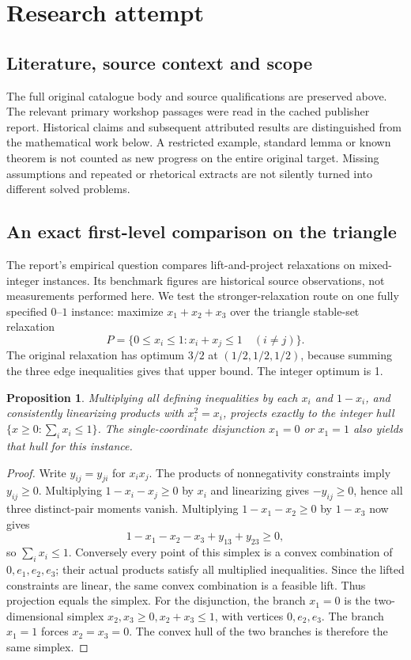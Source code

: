 \documentclass[11pt]{article}
\newtheorem{proposition}{Proposition}
\begin{document}
\section{Research attempt}
\subsection{Literature, source context and scope}
The full original catalogue body and source qualifications are preserved above. The relevant primary workshop passages were read in the cached publisher report. Historical claims and subsequent attributed results are distinguished from the mathematical work below. A restricted example, standard lemma or known theorem is not counted as new progress on the entire original target. Missing assumptions and repeated or rhetorical extracts are not silently turned into different solved problems.

\subsection{An exact first-level comparison on the triangle}
The report's empirical question compares lift-and-project relaxations on mixed-integer instances. Its benchmark figures are historical source observations, not measurements performed here. We test the stronger-relaxation route on one fully specified $0$--$1$ instance: maximize $x_1+x_2+x_3$ over the triangle stable-set relaxation
\[
P=\{0\le x_i\le1:x_i+x_j\le1\quad(i\ne j)\}.
\]
The original relaxation has optimum $3/2$ at $(1/2,1/2,1/2)$, because summing the three edge inequalities gives that upper bound. The integer optimum is 1.
\begin{proposition}
Multiplying all defining inequalities by each $x_i$ and $1-x_i$, and consistently linearizing products with $x_i^2=x_i$, projects exactly to the integer hull $\{x\ge0:\sum_i x_i\le1\}$. The single-coordinate disjunction $x_1=0$ or $x_1=1$ also yields that hull for this instance.
\end{proposition}
\begin{proof}
Write $y_{ij}=y_{ji}$ for $x_ix_j$. The products of nonnegativity constraints imply $y_{ij}\ge0$. Multiplying $1-x_i-x_j\ge0$ by $x_i$ and linearizing gives $-y_{ij}\ge0$, hence all three distinct-pair moments vanish. Multiplying $1-x_1-x_2\ge0$ by $1-x_3$ now gives
\[
1-x_1-x_2-x_3+y_{13}+y_{23}\ge0,
\]
so $\sum_i x_i\le1$. Conversely every point of this simplex is a convex combination of $0,e_1,e_2,e_3$; their actual products satisfy all multiplied inequalities. Since the lifted constraints are linear, the same convex combination is a feasible lift. Thus projection equals the simplex.
For the disjunction, the branch $x_1=0$ is the two-dimensional simplex $x_2,x_3\ge0,x_2+x_3\le1$, with vertices $0,e_2,e_3$. The branch $x_1=1$ forces $x_2=x_3=0$. The convex hull of the two branches is therefore the same simplex.
\end{proof}
\end{document}
